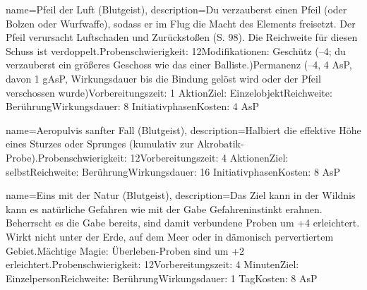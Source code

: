 {
    name={Pfeil der Luft (Blutgeist)},
    description={Du verzauberst einen Pfeil (oder Bolzen oder Wurfwaffe), sodass er im Flug die Macht des Elements freisetzt. Der Pfeil verursacht Luftschaden und Zurückstoßen (S. 98). Die Reichweite für diesen Schuss ist verdoppelt.\newline Probenschwierigkeit: 12\newline Modifikationen: Geschütz (–4; du verzauberst ein größeres Geschoss wie das einer Balliste.)\newline Permanenz (–4, 4 AsP, davon 1 gAsP, Wirkungsdauer bis die Bindung gelöst wird oder der Pfeil verschossen wurde)\newline Vorbereitungszeit: 1 Aktion\newline Ziel: Einzelobjekt\newline Reichweite: Berührung\newline Wirkungsdauer: 8 Initiativphasen\newline Kosten: 4 AsP}
}


{
    name={Aeropulvis sanfter Fall (Blutgeist)},
    description={Halbiert die effektive Höhe eines Sturzes oder Sprunges (kumulativ zur Akrobatik-Probe).\newline Probenschwierigkeit: 12\newline Vorbereitungszeit: 4 Aktionen\newline Ziel: selbst\newline Reichweite: Berührung\newline Wirkungsdauer: 16 Initiativphasen\newline Kosten: 8 AsP}
}


{
    name={Eins mit der Natur (Blutgeist)},
    description={Das Ziel kann in der Wildnis kann es natürliche Gefahren wie mit der Gabe Gefahreninstinkt erahnen. Beherrscht es die Gabe bereits, sind damit verbundene Proben um +4 erleichtert. Wirkt nicht unter der Erde, auf dem Meer oder in dämonisch pervertiertem Gebiet.\newline Mächtige Magie: Überleben-Proben sind um +2 erleichtert.\newline Probenschwierigkeit: 12\newline Vorbereitungszeit: 4 Minuten\newline Ziel: Einzelperson\newline Reichweite: Berührung\newline Wirkungsdauer: 1 Tag\newline Kosten: 8 AsP}
}


